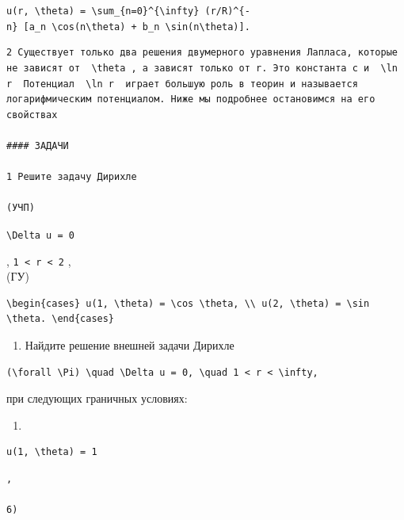 \documentclass[
  ukrainian,
]{article}
\providecommand{\tightlist}{%
  \setlength{\itemsep}{0pt}\setlength{\parskip}{0pt}}
\begin{document}
\texttt{u(r,\ \textbackslash{}theta)\ =\ \textbackslash{}sum\_\{n=0\}\^{}\{\textbackslash{}infty\}\ (r/R)\^{}\{-n\}\ {[}a\_n\ \textbackslash{}cos(n\textbackslash{}theta)\ +\ b\_n\ \textbackslash{}sin(n\textbackslash{}theta){]}.}

\begin{verbatim}
2 Существует только два решения двумерного уравнения Лапласа, которые не зависят от  \theta , а зависят только от r. Это константа c и  \ln r  Потенциал  \ln r  играет большую роль в теорин и называется логарифмическим потенциалом. Ниже мы подробнее остановимся на его свойствах

#### ЗАДАЧИ

1 Решите задачу Дирихле

(УЧП)
\end{verbatim}

\texttt{\textbackslash{}Delta\ u\ =\ 0}

, \texttt{1\ \textless{}\ r\ \textless{}\ 2} ,\\
(ГУ)

\begin{verbatim}
\begin{cases} u(1, \theta) = \cos \theta, \\ u(2, \theta) = \sin \theta. \end{cases}
\end{verbatim}

\begin{enumerate}
\def\labelenumi{\arabic{enumi}.}
\setcounter{enumi}{1}
\tightlist
\item
  Найдите решение внешней задачи Дирихле
\end{enumerate}

\begin{verbatim}
(\forall \Pi) \quad \Delta u = 0, \quad 1 < r < \infty,
\end{verbatim}

при следующих граничных условиях:

\begin{enumerate}
\def\labelenumi{\alph{enumi})}
\tightlist
\item
\end{enumerate}

\begin{verbatim}
u(1, \theta) = 1
\end{verbatim}

\begin{verbatim}
,

6)
\end{verbatim}
\end{document}
